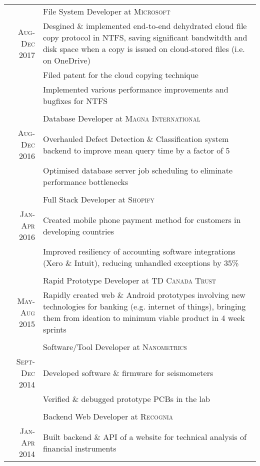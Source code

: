 \documentclass[a4paper,10pt]{article}
\begin{document}
\begin{tabular}{r|p{15.4cm}}
& File System Developer at \textsc{Microsoft} \\ \textsc{Aug-Dec 2017}
&\footnotesize{Desgined \& implemented end-to-end dehydrated cloud file copy protocol in NTFS, saving significant bandwitdth and disk space when a copy is issued on cloud-stored files (i.e. on OneDrive)}\\
&\footnotesize{Filed patent for the cloud copying technique}\\
&\footnotesize{Implemented various performance improvements and bugfixes for NTFS}\\

\multicolumn{2}{c}{} \\
& Database Developer at \textsc{Magna International} \\ \textsc{Aug-Dec 2016}
&\footnotesize{Overhauled Defect Detection \& Classification system backend to improve mean query time by a factor of 5}\\
&\footnotesize{Optimised database server job scheduling to eliminate performance bottlenecks}\\

\multicolumn{2}{c}{} \\
& Full Stack Developer at \textsc{Shopify} \\
\textsc{Jan-Apr 2016}
&\footnotesize{Created mobile phone payment method for customers in developing countries}\\
&\footnotesize{Improved resiliency of accounting software integrations (Xero \& Intuit), reducing unhandled exceptions by 35\%}\\

\multicolumn{2}{c}{} \\
& Rapid Prototype Developer at \textsc{TD Canada Trust}\\
\textsc{May-Aug 2015}
&\footnotesize{Rapidly created web \& Android prototypes involving new technologies for banking (e.g. internet of things), bringing them from ideation to minimum viable product in 4 week sprints}\\

\multicolumn{2}{c}{}\\
& Software/Tool Developer at \textsc{Nanometrics} \\
\textsc{Sept-Dec 2014}
&\footnotesize{Developed software \& firmware for seismometers}\\
&\footnotesize{Verified \& debugged prototype PCBs in the lab}\\

\multicolumn{2}{c}{} \\
& Backend Web Developer at \textsc{Recognia} \\
\textsc{Jan-Apr 2014}
& \footnotesize{Built backend \& API of a website for technical analysis of financial instruments}
\end{tabular}
\end{document}
